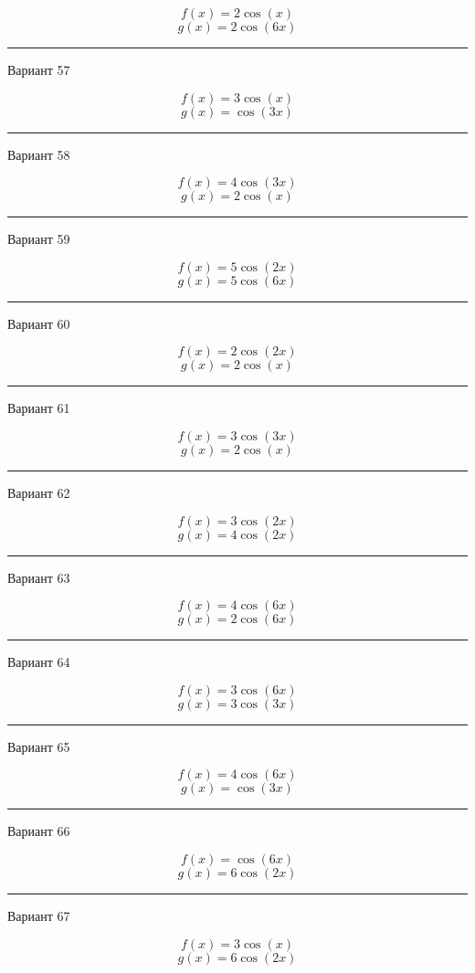 \documentclass[11pt]{report}
\begin{document}
$$f(x)=2 \cos{\left(x \right)}$$
$$g(x)=2 \cos{\left(6 x \right)}$$

\rule{\textwidth}{.2mm}

Вариант 57

$$f(x)=3 \cos{\left(x \right)}$$
$$g(x)=\cos{\left(3 x \right)}$$

\rule{\textwidth}{.2mm}

Вариант 58

$$f(x)=4 \cos{\left(3 x \right)}$$
$$g(x)=2 \cos{\left(x \right)}$$

\rule{\textwidth}{.2mm}

Вариант 59

$$f(x)=5 \cos{\left(2 x \right)}$$
$$g(x)=5 \cos{\left(6 x \right)}$$

\rule{\textwidth}{.2mm}

Вариант 60

$$f(x)=2 \cos{\left(2 x \right)}$$
$$g(x)=2 \cos{\left(x \right)}$$

\rule{\textwidth}{.2mm}

Вариант 61

$$f(x)=3 \cos{\left(3 x \right)}$$
$$g(x)=2 \cos{\left(x \right)}$$

\rule{\textwidth}{.2mm}

Вариант 62

$$f(x)=3 \cos{\left(2 x \right)}$$
$$g(x)=4 \cos{\left(2 x \right)}$$

\rule{\textwidth}{.2mm}

Вариант 63

$$f(x)=4 \cos{\left(6 x \right)}$$
$$g(x)=2 \cos{\left(6 x \right)}$$

\rule{\textwidth}{.2mm}

Вариант 64

$$f(x)=3 \cos{\left(6 x \right)}$$
$$g(x)=3 \cos{\left(3 x \right)}$$

\rule{\textwidth}{.2mm}

Вариант 65

$$f(x)=4 \cos{\left(6 x \right)}$$
$$g(x)=\cos{\left(3 x \right)}$$

\rule{\textwidth}{.2mm}

Вариант 66

$$f(x)=\cos{\left(6 x \right)}$$
$$g(x)=6 \cos{\left(2 x \right)}$$

\rule{\textwidth}{.2mm}

Вариант 67

$$f(x)=3 \cos{\left(x \right)}$$
$$g(x)=6 \cos{\left(2 x \right)}$$
\end{document}
